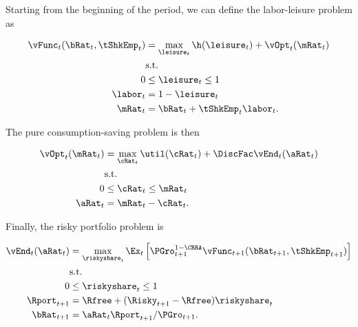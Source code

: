 \documentclass[\econtexRoot/SequentialEGM]{subfiles}
\begin{document}
Starting from the beginning of the period, we can define the labor-leisure problem as

\begin{equation}
  \begin{split}
    \vFunc_{t}(\bRat_{t}, \tShkEmp_{t}) & = \max_{ \leisure_{t}}
    \h(\leisure_{t}) + \vOpt_{t} (\mRat_{t}) \\
    & \text{s.t.} \\
    0 & \leq \leisure_{t} \leq 1 \\
    \labor_{t} & = 1 - \leisure_{t} \\
    \mRat_{t} & = \bRat_{t} + \tShkEmp_{t}\labor_{t}.
  \end{split}
\end{equation}

The pure consumption-saving problem is then

\begin{equation}
  \begin{split}
    \vOpt_{t}(\mRat_{t}) & = \max_{\cRat_{t}} \util(\cRat_{t}) + \DiscFac\vEnd_{t}(\aRat_{t}) \\
    & \text{s.t.} \\
    0 & \leq \cRat_{t} \leq \mRat_{t} \\
    \aRat_{t} & = \mRat_{t} - \cRat_{t}.
  \end{split}
\end{equation}

Finally, the risky portfolio problem is

\begin{equation}
  \begin{split}
    \vEnd_{t}(\aRat_{t}) & = \max_{\riskyshare_{t}}
    \Ex_{t} \left[ \PGro_{t+1}^{1-\CRRA}
      \vFunc_{t+1}(\bRat_{t+1},
      \tShkEmp_{t+1}) \right] \\
    & \text{s.t.} \\
    0 & \leq \riskyshare_{t} \leq 1 \\
    \Rport_{t+1} & = \Rfree + (\Risky_{t+1} - \Rfree)
    \riskyshare_{t} \\
    \bRat_{t+1} & = \aRat_{t} \Rport_{t+1} / \PGro_{t+1}.
  \end{split}
\end{equation}
\end{document}
